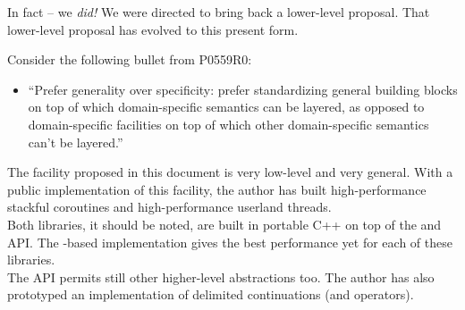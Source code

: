 
In fact -- we \emph{did!}\cite{N3708}\citecomma\cite{N3985} We were directed
to bring back a lower-level proposal. That lower-level proposal has evolved to
this present form.


Consider the following bullet from P0559R0:\cite{P0559R0}

\begin{itemize}
\item ``Prefer generality over specificity: prefer standardizing general
  building blocks on top of which domain-specific semantics can be layered, as
  opposed to domain-specific facilities on top of which other domain-specific
  semantics can't be layered.''
\end{itemize}

The \callcc facility proposed in this document is very low-level and very
general. With a public implementation of this facility,\cite{bcontext} the
author has built high-performance stackful coroutines\cite{bcoroutine2} and
high-performance userland threads\cite{bfiber}.\\

Both libraries, it should be noted, are built in portable C++ on top of the
 and  API. The -based
implementation gives the best performance yet\cite{bfiberperf} for each of
these libraries.\\

The API permits still other higher-level abstractions too. The author has also
prototyped an implementation of delimited continuations (\shift and \reset
operators).
